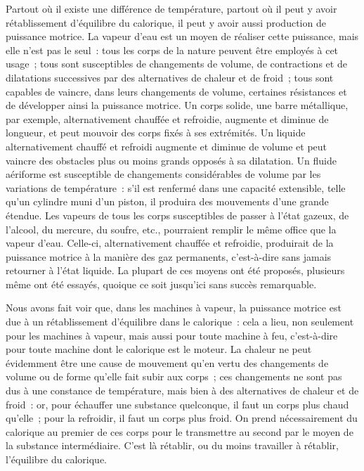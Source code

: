 \documentclass[french,twoside]{book} %
\begin{document}
Partout où il existe une différence de température, partout où il peut y avoir rétablissement d’équilibre du calorique, il peut y avoir aussi production de puissance motrice. La vapeur d’eau est un moyen de réaliser cette puissance, mais elle n’est pas le seul : tous les corps de la nature peuvent être employés à cet usage ; tous sont susceptibles de changements de volume, de contractions et de dilatations successives par des alternatives de chaleur et de froid ; tous sont capables de vaincre, dans leurs changements de volume, certaines résistances et de développer ainsi la puissance motrice. Un corps solide, une barre métallique, par exemple, alternativement chauffée et refroidie, augmente et diminue de longueur, et peut mouvoir des corps fixés à ses extrémités. Un liquide alternativement chauffé et refroidi augmente et diminue de volume et peut vaincre des obstacles plus ou moins grands opposés à sa dilatation. Un fluide aériforme est susceptible de changements considérables de volume par les variations de température : s’il est renfermé dans une capacité extensible, telle qu’un cylindre muni d’un piston, il produira des mouvements d’une grande étendue. Les vapeurs de tous les corps susceptibles de passer à l’état gazeux, de l’alcool, du mercure, du soufre, etc., pourraient remplir le même office que la vapeur d’eau. Celle-ci, alternativement chauffée et refroidie, produirait de la puissance motrice à la manière des gaz permanents, c’est-à-dire sans jamais retourner à l’état liquide. La plupart de ces moyens ont été proposés, plusieurs même ont été essayés, quoique ce soit jusqu’ici sans succès remarquable.\par
Nous avons fait voir que, dans les machines à vapeur, la puissance motrice est due à un rétablissement d’équilibre dans le calorique : cela a lieu, non seulement pour les machines à vapeur, mais aussi pour toute machine à feu, c’est-à-dire pour toute machine dont le calorique est le moteur. La chaleur ne peut évidemment être une cause de mouvement qu’en vertu des changements de volume ou de forme qu’elle fait subir aux corps ; ces changements ne sont pas dus à une constance de température, mais bien à des alternatives de chaleur et de froid : or, pour échauffer une substance quelconque, il faut un corps plus chaud qu’elle ; pour la refroidir, il faut un corps plus froid. On prend nécessairement du calorique au premier de ces corps pour le transmettre au second par le moyen de la substance intermédiaire. C’est là rétablir, ou du moins travailler à rétablir, l’équilibre du calorique.\par
\end{document}
